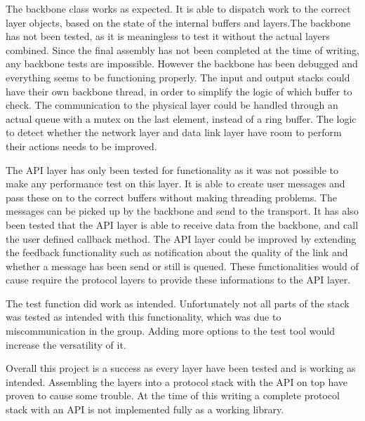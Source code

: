 The backbone class works as expected. It is able to dispatch work to the correct layer objects, based on the state of the internal buffers and layers.The backbone has not been tested, as it is meaningless to test it without the actual layers combined. Since the final assembly has not been completed at the time of writing, any backbone tests are impossible. However the backbone has been debugged and everything seems to be functioning properly.
The input and output stacks could have their own backbone thread, in order to simplify the logic of which buffer to check. The communication to the physical layer could be handled through an actual queue with a mutex on the last element, instead of a ring buffer. The logic to detect whether the network layer and data link layer have room to perform their actions needs to be improved.

The API layer has only been tested for functionality as it was not possible to make any performance test on this layer. It is able to create user messages and pass these on to the correct buffers without making threading problems. The messages can be picked up by the backbone and send to the transport. It has also been tested that the API layer is able to receive data from the backbone, and call the user defined callback method. The API layer could be improved by extending the feedback functionality such as notification about the quality of the link and whether a message has been send or still is queued. These functionalities would of cause require the protocol layers to provide these informations to the API layer.

The test function did work as intended. Unfortunately not all parts of the stack was tested as intended with this functionality, which was due to miscommunication in the group. Adding more options to the test tool would increase the versatility of it.

Overall this project is a success as every layer have been tested and is working as intended. Assembling the layers into a protocol stack with the API on top have proven to cause some trouble. At the time of this writing a complete protocol stack with an API is not implemented fully as a working library.